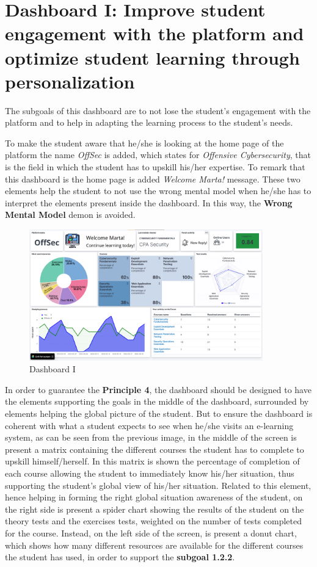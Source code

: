 \section{Dashboard I: Improve student engagement with the platform and optimize student learning through personalization}

The subgoals of this dashboard are to not lose the student's engagement with 
the platform and to help in adapting the learning process to the student's
needs. 

To make the student aware that he/she is looking
at the home page of the platform the name \textit{OffSec} is added,
which states for \textit{Offensive Cybersecurity}, that is the field
in which the student has to upskill his/her expertise. To remark that this
dashboard is the home page is added \textit{Welcome Marta!} message.
These two elements help the student to not use the wrong mental model
when he/she has to interpret the elements present inside the dashboard.
In this way, the \textbf{Wrong Mental Model} demon is avoided.

\begin{figure}[H]
    \centering
    \includegraphics[width=0.9\textwidth]{assets/dashboard_1.png}
    \caption{Dashboard I}
    \label{fig:dashboard_1}
\end{figure}

In order to guarantee the \textbf{Principle 4}, the dashboard should be designed to have the
elements supporting the goals in the middle of the dashboard, surrounded by elements helping the
global picture of the student. But to ensure the dashboard
is coherent with what a student expects to see when he/she visits an e-learning system, as 
can be seen from the previous image, in the middle of the screen is present a matrix containing 
the different courses the student has to complete to upskill himself/herself. In this matrix is 
shown the percentage of completion of each course allowing the student to immediately know his/her
situation, thus supporting the student's global view of his/her situation. Related to this element, hence
helping in forming the right global situation awareness of the student, on 
the right side is present a spider chart showing the results of the student on the theory tests and
the exercises tests, weighted on the number of tests completed for the course.
Instead, on the left side of the screen, is present a
donut chart, which shows how many different resources are available for the different courses 
the student has used, in order to support the \textbf{subgoal 1.2.2}.

